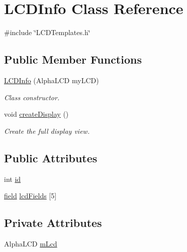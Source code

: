 \hypertarget{class_l_c_d_info}{\section{L\-C\-D\-Info Class Reference}
\label{class_l_c_d_info}
}


{\ttfamily \#include \char`\"{}L\-C\-D\-Templates.\-h\char`\"{}}

\subsection*{Public Member Functions}
\begin{DoxyCompactItemize}
\item 
\hyperlink{class_l_c_d_info_a9124c4f894b600b6a5e2ddc9c002aafe}{L\-C\-D\-Info} (Alpha\-L\-C\-D my\-L\-C\-D)
\begin{DoxyCompactList}\small\item\em Class constructor. \end{DoxyCompactList}\item 
void \hyperlink{class_l_c_d_info_acfc7d567df659326286b9f23d4555a9e}{create\-Display} ()
\begin{DoxyCompactList}\small\item\em Create the full display view. \end{DoxyCompactList}\end{DoxyCompactItemize}
\subsection*{Public Attributes}
\begin{DoxyCompactItemize}
\item 
int \hyperlink{class_l_c_d_info_a5db014a0128927be1cf6d10885277e91}{id}
\item 
\hyperlink{_l_c_d_templates_8h_a20a49e010fbfc3a43959f12d92e01bb6}{field} \hyperlink{class_l_c_d_info_a74e827124b7095a16e00c3cff84213c7}{lcd\-Fields} \mbox{[}5\mbox{]}
\end{DoxyCompactItemize}
\subsection*{Private Attributes}
\begin{DoxyCompactItemize}
\item 
Alpha\-L\-C\-D \hyperlink{class_l_c_d_info_acc94f8a06df70cf4578c1d43f9dfa20b}{m\-Lcd}
\end{DoxyCompactItemize}


